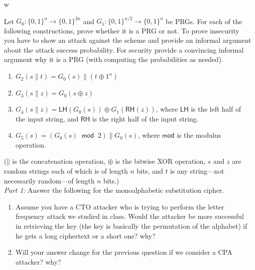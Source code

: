 w\documentclass[12pt]{article}
\newcommand{\zo}{\{0,1\}}
\newcommand*\concat{\mathbin{\|}}
\newcommand\xor{\oplus}
\begin{document}
Let $G_0:\zo^n \to \zo^{2n}$ and $G_1:\zo^{n/2} \to \zo^{n}$ be PRGs. For each of the following constructions, prove whether it is a PRG or not. To prove insecurity you have to show an attack against the scheme and provide an informal argument about the attack success probability. For security provide a convincing informal argument why it is a PRG (with computing the probabilities as needed).
\begin{enumerate}
\item $G_2(s \concat t)= G_0(s) \concat (t \xor 1^n)$ 

\item $G_3(s \concat z)= G_0(s \oplus z)$

\item $G_4(s \concat z) =  \mathsf{LH}(G_0(s)) \oplus G_1(\mathsf{RH}(z))$, where $\mathsf{LH}$ is the left half of the input string, and $\mathsf{RH}$ is the right half of the input string.

\item $G_5(s) = (G_0(s) \;\; \mathsf{mod} \;\; 2) \concat G_0(s)$, where $\mathsf{mod}$ is the modulus operation.
\end{enumerate} 
($\concat$ is the concatenation operation, $\oplus$ is the bitwise XOR operation, $s$ and $z$ are random strings each of which is of length $n$ bits, and $t$ is any string---not necessarily random---of length $n$ bits.)\\


\newpage
{}
\noindent\emph{Part 1:} Answer the following for the monoalphabetic substitution cipher.
\begin{enumerate}
\item Assume you have a CTO attacker who is trying to perform the letter frequency attack we studied in class. Would the attacker be more successful in retrieving the key (the key is basically the permutation of the alphabet) if he gets a long ciphertext or a short one? why? 

\item Will your answer change for the previous question if we consider a CPA attacker? why?
\end{enumerate}
\end{document}

